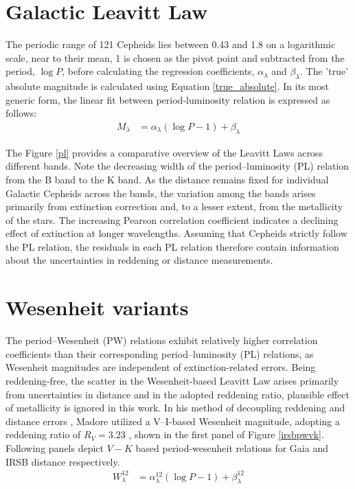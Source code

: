 \section{Galactic Leavitt Law}
The periodic range of 121 Cepheids lies between 0.43 and 1.8 on a logarithmic scale, near to their mean, 1 is chosen as the pivot point and subtracted from the period, $\log P $,  before calculating the regression coefficients, $\alpha_\lambda$ and $\beta_\lambda$. The 'true' absolute magnitude is calculated using Equation \ref{true_absolute}. In its most generic form, the linear fit between period-luminosity relation is expressed as follows:
\begin{align}\label{eq:plr}
	M_\lambda & = \alpha_\lambda (\log P -1) + \beta_\lambda 
\end{align}

The Figure \ref{pl} provides a comparative overview of the Leavitt Laws across different bands. Note the decreasing width of the period–luminosity (PL) relation from the B band to the K band. As the distance remains fixed for individual Galactic Cepheids across the bands, the variation among the bands arises primarily from extinction correction and, to a lesser extent, from the metallicity of the stars. The increasing Pearson correlation coefficient indicates a declining effect of extinction at longer wavelengths. Assuming that Cepheids strictly follow the PL relation, the residuals in each PL relation therefore contain information about the uncertainties in reddening or distance measurements.

 


\section{Wesenheit variants}

The period–Wesenheit (PW) relations exhibit relatively higher correlation coefficients than their corresponding period–luminosity (PL) relations, as Wesenheit magnitudes are independent of extinction-related errors. Being reddening-free, the scatter in the Wesenheit-based Leavitt Law arises primarily from uncertainties in distance and in the adopted reddening ratio, plausible effect of metallicity is ignored in this work. In his method of decoupling reddening and distance errors \citep{2017madore}, Madore utilized a V–I-based Wesenheit magnitude, adopting a reddening ratio of $R_V = 3.23$ \citep{2004sandage}, shown in the first panel of Figure \ref{irsbpwvk}. Following panels depict $V-K$ based period-wesenheit relations for Gaia and IRSB distance respectively. 
\begin{align}\label{eq:plw}
	W_\lambda^{12} &  = \alpha_\lambda^{12} (\log P -1) + \beta_\lambda^{12}
\end{align}

